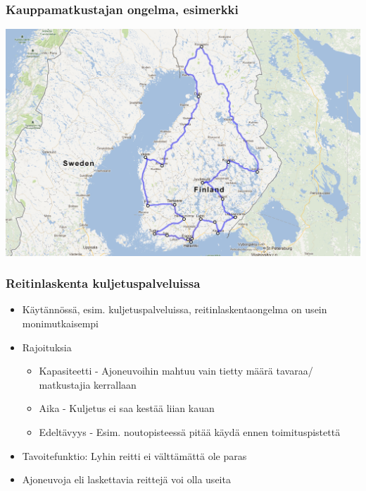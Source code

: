 \documentclass{beamer}
\begin{document}
        \begin{frame}
  \frametitle{Kauppamatkustajan ongelma, esimerkki}   %
\centering
\includegraphics[scale=0.25]{tspdemo02}
    \end{frame}
    

\begin{frame}
    \frametitle{Reitinlaskenta kuljetuspalveluissa}
    \begin{itemize}
    \item
    Käytännössä, esim. kuljetuspalveluissa, reitinlaskentaongelma on usein monimutkaisempi
    \item
    Rajoituksia
    \begin{itemize}
\item 
Kapasiteetti - Ajoneuvoihin mahtuu vain tietty määrä tavaraa/ matkustajia kerrallaan
\item
Aika - Kuljetus ei saa kestää liian kauan
\item
Edeltävyys - Esim. noutopisteessä pitää käydä ennen toimituspistettä
\end{itemize}
\item
Tavoitefunktio: Lyhin reitti ei välttämättä ole paras
\item
Ajoneuvoja eli laskettavia reittejä voi olla useita
  \end{itemize}

\end{frame}
\end{document}
